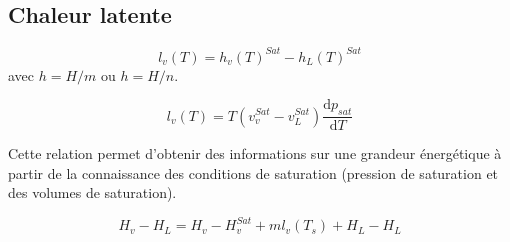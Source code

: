 \documentclass[french]{yLectureNote}
\newcommand{\dd}[0]{\mathrm{d}}
\begin{document}
\subsection{Chaleur latente}
\begin{definition}
    $$l_v(T) = h_v(T)^{Sat}-h_L(T)^{Sat}$$ avec $h = H/m$ ou $h=H/n$.
\end{definition}
\begin{theorem}
    $$l_v(T) = T(v_v^{Sat}-v_L^{Sat})\frac{\dd p_{sat}}{\dd T}$$
\end{theorem}
Cette relation permet d'obtenir des informations sur une grandeur énergétique à partir de la connaissance des conditions de saturation (pression de saturation et des volumes de saturation).
\begin{theorem}
    $$H_v-H_L = H_v-H_v^{Sat}+ml_v(T_s)+H_L-H_L$$
\end{theorem}
\end{document}
